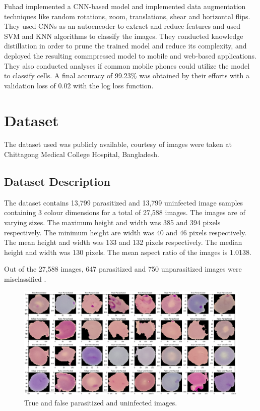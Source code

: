 \documentclass[10pt,twocolumn,letterpaper]{article}
\begin{document}
Fuhad \etal implemented a CNN-based model and implemented data augmentation techniques like random rotations, zoom, translations, shear and horizontal flips. They used CNNs as an autoencoder to extract and reduce features and used SVM and KNN algorithms to classify the images. They conducted knowledge distillation in order to prune the trained model and reduce its complexity, and deployed the resulting commpressed model to mobile and web-based applications. They also conducted analyses if common mobile phones could utilize the model to classify cells. A final accuracy of 99.23\% was obtained by their efforts with a validation loss of 0.02 with the log loss function\cite{fuhadmalaria}.

\section{Dataset}
The dataset used was publicly available, courtesy of  images were taken at Chittagong Medical College Hospital, Bangladesh.\cite{datasetref}

\subsection{Dataset Description}
The dataset contains 13,799 parasitized and 13,799 uninfected image samples containing 3 colour dimensions for a total of 27,588 images. The images are of varying sizes. The maximum height and width was 385 and 394 pixels respectively. The minimum height are width was 40 and 46 pixels respectively. The mean height and width was 133 and 132 pixels respectively. The median height and width was 130 pixels. The mean aspect ratio of the images is 1.0138.

Out of the 27,588 images, 647 parasitized and 750 unparasitized images were misclassified \cite{fuhadmalaria}.

\begin{figure}[t]
   \begin{center}
      \includegraphics[width=1\linewidth]{../Plots/image_vis.png}
   \end{center}
      \caption{True and false parasitized and uninfected images.}
   \label{fig:malaria_image}
\end{figure}
\end{document}
